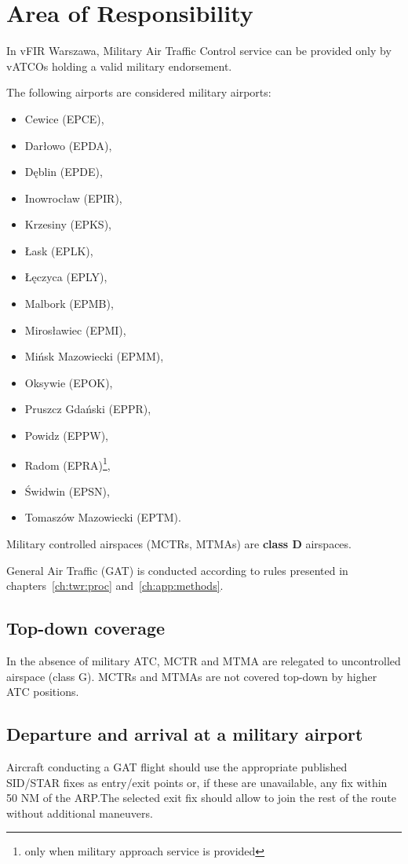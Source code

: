 \chapter{Area of Responsibility}

In vFIR Warszawa, Military Air Traffic Control service can be provided only by vATCOs holding a valid military endorsement.

The following airports are considered military airports:
\begin{itemize}
	\item Cewice (EPCE),
	\item Darłowo (EPDA),
	\item Dęblin (EPDE),
	\item Inowrocław (EPIR),
	\item Krzesiny (EPKS),
	\item Łask (EPLK),
	\item Łęczyca (EPLY),
	\item Malbork (EPMB),
	\item Mirosławiec (EPMI),
	\item Mińsk Mazowiecki (EPMM),
	\item Oksywie (EPOK),
	\item Pruszcz Gdański (EPPR),
	\item Powidz (EPPW),
	\item Radom (EPRA)\footnote{only when military approach service is provided},
	\item Świdwin (EPSN),
	\item Tomaszów Mazowiecki (EPTM).
\end{itemize}

Military controlled airspaces (MCTRs, MTMAs) are \textbf{class D} airspaces.

General Air Traffic (GAT) is conducted according to rules presented in chapters~\ref{ch:twr:proc} and~\ref{ch:app:methods}.

\section{Top-down coverage}
In the absence of military ATC, MCTR and MTMA are relegated to uncontrolled airspace (class G). MCTRs and MTMAs are not covered top-down by higher ATC positions.

\section{Departure and arrival at a military airport}
Aircraft conducting a GAT flight should use the appropriate published SID/STAR fixes as entry/exit points or, if these are unavailable, any fix within 50 NM of the ARP.\@ The selected exit fix should allow to join the rest of the route without additional maneuvers.

